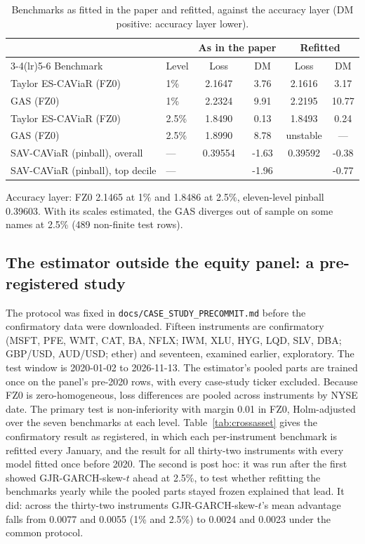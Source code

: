 \begin{table}[htbp]\centering\begin{threeparttable}
\caption{Benchmarks as fitted in the paper and refitted, against the accuracy layer (DM positive: accuracy layer lower).}\label{tab:refit}\footnotesize
\begin{tabular}{llcccc}\toprule
 & & \multicolumn{2}{c}{As in the paper} & \multicolumn{2}{c}{Refitted} \\ \cmidrule(lr){3-4}\cmidrule(lr){5-6}
Benchmark & Level & Loss & DM & Loss & DM \\ \midrule
Taylor ES-CAViaR (FZ0) & 1\% & 2.1647 & 3.76 & 2.1616 & 3.17 \\
GAS (FZ0) & 1\% & 2.2324 & 9.91 & 2.2195 & 10.77 \\
Taylor ES-CAViaR (FZ0) & 2.5\% & 1.8490 & 0.13 & 1.8493 & 0.24 \\
GAS (FZ0) & 2.5\% & 1.8990 & 8.78 & unstable & --- \\
SAV-CAViaR (pinball), overall & --- & 0.39554 & -1.63 & 0.39592 & -0.38 \\
SAV-CAViaR (pinball), top decile & --- &  & -1.96 &  & -0.77 \\
\bottomrule\end{tabular}
\begin{tablenotes}\footnotesize\item Accuracy layer: FZ0 2.1465 at 1\% and 1.8486 at 2.5\%, eleven-level pinball 0.39603. With its scales estimated, the GAS diverges out of sample on some names at 2.5\% (489 non-finite test rows).\end{tablenotes}
\end{threeparttable}\end{table}

\subsection*{The estimator outside the equity panel: a pre-registered study}
The protocol was fixed in \texttt{docs/CASE\_STUDY\_PRECOMMIT.md} before the confirmatory data were downloaded. Fifteen instruments are confirmatory (MSFT, PFE, WMT, CAT, BA, NFLX; IWM, XLU, HYG, LQD, SLV, DBA; GBP/USD, AUD/USD; ether) and seventeen, examined earlier, exploratory. The test window is 2020-01-02 to 2026-11-13. The estimator's pooled parts are trained once on the panel's pre-2020 rows, with every case-study ticker excluded. Because FZ0 is zero-homogeneous, loss differences are pooled across instruments by NYSE date. The primary test is non-inferiority with margin 0.01 in FZ0, Holm-adjusted over the seven benchmarks at each level. Table~\ref{tab:crossasset} gives the confirmatory result as registered, in which each per-instrument benchmark is refitted every January, and the result for all thirty-two instruments with every model fitted once before 2020. The second is post hoc: it was run after the first showed GJR-GARCH-skew-$t$ ahead at 2.5\%, to test whether refitting the benchmarks yearly while the pooled parts stayed frozen explained that lead. It did: across the thirty-two instruments GJR-GARCH-skew-$t$'s mean advantage falls from 0.0077 and 0.0055 (1\% and 2.5\%) to 0.0024 and 0.0023 under the common protocol.

